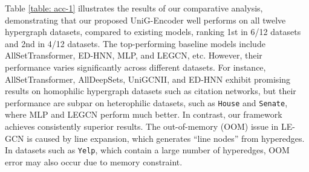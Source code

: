 \documentclass[review]{elsarticle}
\begin{document}
Table \ref{table: acc-1} illustrates the results of our comparative analysis, demonstrating that our proposed UniG-Encoder well performs on all twelve hypergraph datasets, compared to existing models, ranking 1st in 6/12 datasets and 2nd in 4/12 datasets. The top-performing baseline models include AllSetTransformer, ED-HNN, MLP, and LEGCN, etc. However, their performance varies significantly across different datasets. For instance, AllSetTransformer, AllDeepSets, UniGCNII, and ED-HNN exhibit promising results on homophilic hypergraph datasets such as citation networks, but their performance are subpar on heterophilic datasets, such as \texttt{House} and \texttt{Senate}, where MLP and LEGCN perform much better. In contrast, our framework achieves consistently superior results. The out-of-memory (OOM) issue in LE-GCN is caused by line expansion, which generates ``line nodes'' from hyperedges. In datasets such as \texttt{Yelp}, which contain a large number of hyperedges, OOM error may also occur due to memory constraint.
\end{document}
